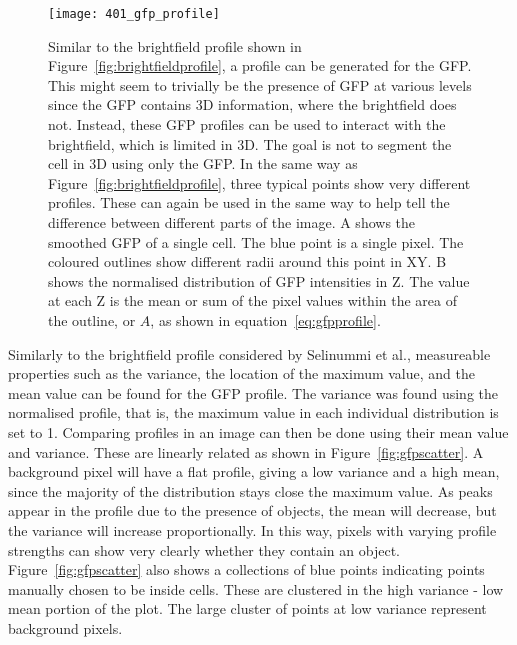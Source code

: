 \begin{figure}[h!]
 \centering
 \texttt{[image: 401\_gfp\_profile]}
 \caption[The GFP profile]{
 	Similar to the brightfield profile shown in Figure~\ref{fig:brightfieldprofile}, a profile can be generated for the GFP. This might seem to trivially be the presence of GFP at various levels since the GFP contains 3D information, where the brightfield does not. Instead, these GFP profiles can be used to interact with the brightfield, which is limited in 3D. The goal is not to segment the cell in 3D using only the GFP. In the same way as Figure~\ref{fig:brightfieldprofile}, three typical points show very different profiles. These can again be used in the same way to help tell the difference between different parts of the image. A shows the smoothed GFP of a single cell. The blue point is a single pixel. The coloured outlines show different radii around this point in XY. B shows the normalised distribution of GFP intensities in Z. The value at each Z is the mean or sum of the pixel values within the area of the outline, or $A$, as shown in equation~\ref{eq:gfpprofile}.
 }
 \label{fig:gfpprofile}
\end{figure}

Similarly to the brightfield profile considered by Selinummi et al., measureable properties such as the variance, the location of the maximum value, and the mean value can be found for the GFP profile. The variance was found using the normalised profile, that is, the maximum value in each individual distribution is set to 1. Comparing profiles in an image can then be done using their mean value and variance. These are linearly related as shown in Figure~\ref{fig:gfpscatter}. A background pixel will have a flat profile, giving a low variance and a high mean, since the majority of the distribution stays close the maximum value. As peaks appear in the profile due to the presence of objects, the mean will decrease, but the variance will increase proportionally. In this way, pixels with varying profile strengths can show very clearly whether they contain an object. Figure~\ref{fig:gfpscatter} also shows a collections of blue points indicating points manually chosen to be inside cells. These are clustered in the high variance - low mean portion of the plot. The large cluster of points at low variance represent background pixels.

